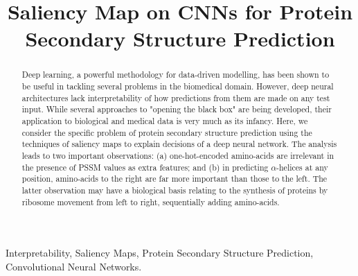 \documentclass{article}
\title{Saliency Map on CNNs for Protein Secondary Structure	Prediction}
\begin{document}
%
\maketitle
%
\begin{abstract}
Deep learning, a powerful methodology for data-driven modelling, has been shown to be useful in tackling several problems in the biomedical domain.
However, deep neural architectures lack interpretability of how predictions from them are made on any test input.
While several approaches to "opening the black box" are being developed, their application to biological and medical data is very much as its infancy.
Here, we consider the specific problem of protein secondary structure prediction using the techniques of saliency maps to explain decisions of a deep neural network.
The analysis leads to two important observations: (a) one-hot-encoded amino-acids are irrelevant in the presence of PSSM values as extra features; and (b) in predicting $\alpha$-helices at any position, amino-acids to the right are far more important than those to the left.
The latter observation may have a biological basis relating to the synthesis of proteins by ribosome movement from left to right, sequentially adding amino-acids.


\end{abstract}
%
\begin{keywords}
Interpretability, Saliency Maps, Protein Secondary Structure Prediction, Convolutional Neural Networks.
\end{keywords}
%
\end{document}
